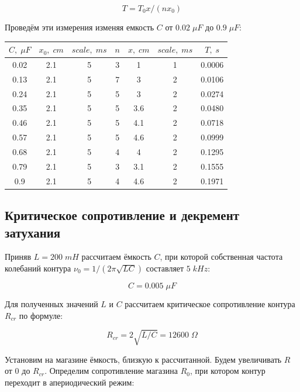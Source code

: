 \documentclass{article}
\begin{document}
\[ T = T_0x/(nx_0) \]

Проведём эти измерения изменяя емкость \( C \) от \( 0.02\; \mu F \) до \( 0.9\; \mu F \):

\begin{table}[H]
    \centering
    \label{table:T}
    \begin{tabular}{|c|c|c|c|c|c|c|}
    \hline
    \(C,\; \mu F \) & \(x_0,\; cm\) & \(scale,\; ms\) & \(n\) & \(x,\; cm\) & \(scale,\; ms\)& \(T,\; s\) \\\hline
    0.02   & 2.1    & 5         & 3 & 1     & 1         & 0.0006 \\\hline
    0.13   & 2.1    & 5         & 7 & 3     & 2         & 0.0106 \\\hline
    0.24   & 2.1    & 5         & 5 & 3     & 2         & 0.0274 \\\hline
    0.35   & 2.1    & 5         & 5 & 3.6   & 2         & 0.0480 \\\hline
    0.46   & 2.1    & 5         & 5 & 4.1   & 2         & 0.0718 \\\hline
    0.57   & 2.1    & 5         & 5 & 4.6   & 2         & 0.0999 \\\hline
    0.68   & 2.1    & 5         & 4 & 4     & 2         & 0.1295 \\\hline
    0.79   & 2.1    & 5         & 3 & 3.1   & 2         & 0.1555 \\\hline
    0.9    & 2.1    & 5         & 4 & 4.6   & 2         & 0.1971 \\\hline
    \end{tabular}
\end{table}

\subsection{Критическое сопротивление и декремент затухания}
Приняв \( L = 200\; mH \) рассчитаем ёмкость \( C \), при которой собственная частота колебаний контура 
\( \nu_0 = 1/(2\pi\sqrt{LC}) \) составляет \( 5\; kHz \):

\[ C = 0.005\; \mu F \]

Для полученных значений \( L \) и \( C \) рассчитаем критическое сопротивление контура \( R_{cr} \) по формуле:

\[ R_{cr} = 2\sqrt{L/C} = 12600\; \Omega \]

Установим на магазине ёмкость, близкую к рассчитанной. Будем увеличивать \( R \) от \( 0 \) до \( R_{cr} \). Определим
сопротивление магазина \( R_0 \), при котором контур переходит в апериодический режим:
\end{document}
